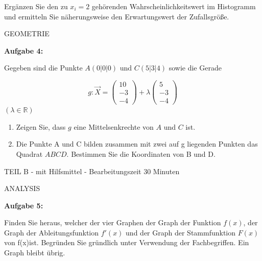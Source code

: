 \documentclass[a4paper,12pt]{article}
\newcommand{\Aufgabe}[1]{
  {
  \vspace*{0.5cm}
  \textsf{\textbf{Aufgabe #1}}
  \vspace*{0.2cm}
  
  }
}
\begin{document}

Ergänzen Sie den zu $x_i=2$ gehörenden Wahrscheinlichkeitswert im Histogramm und ermitteln Sie näherungsweise den Erwartungswert der Zufallsgröße.

\vspace{0.5cm}
GEOMETRIE

\Aufgabe{4:} 

Gegeben sind die Punkte $A (0|0|0)$ und $ C (5|3|4)$ sowie die Gerade

\[
       g: \vec{X} = \begin{pmatrix}10 \\ -3 \\-4 \end{pmatrix} 
                  + \lambda \begin{pmatrix}5 \\ -3 \\-4 \end{pmatrix}          
\] 
$(\lambda \in \mathbb{R})$

\begin{enumerate}[label={\alph*)}]
\item Zeigen Sie, dass $ g$  eine Mittelsenkrechte von $A$ und $C$ ist.
\item  Die Punkte A und C bilden zusammen mit zwei auf g liegenden Punkten das Quadrat
 $ABCD$. Bestimmen Sie die Koordinaten von B und D.
\end{enumerate}

\vspace {0,5cm}


\newpage

\vspace{0,5cm} {TEIL B} - mit Hilfsmittel - Bearbeitungszeit 30 Minuten
\vspace {0,2cm}


\vspace {0,5cm}
ANALYSIS

\Aufgabe{5:}

Finden Sie heraus, welcher der vier Graphen der Graph der Funktion $f(x)$, der Graph der Ableitungsfunktion  $f'(x)$ und der Graph der Stammfunktion  $F(x)$ von f(x)ist. Begründen Sie gründlich unter Verwendung der Fachbegriffen. Ein Graph bleibt übrig.
\end{document}
